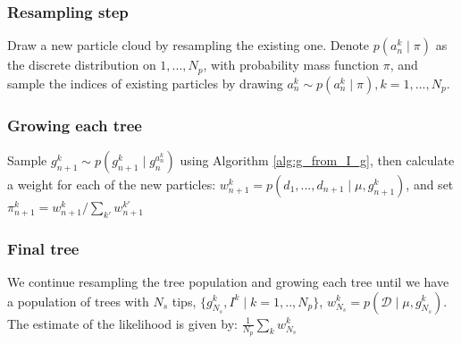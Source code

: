 \documentclass[a4paper,18pt]{report}
\begin{document}
\subsubsection{Resampling step}
Draw a new particle cloud by resampling the existing one. Denote $p(a_n^k \mid \pi)$ as the discrete distribution on $1,...,N_p$, with probability mass function $\pi$, and sample the indices of existing particles by drawing $a_n^k \sim p(a_n^k \mid \pi), k=1,...,N_p$.  

\subsubsection{Growing each tree}
Sample $g_{n+1}^k \sim p(g_{n+1}^k \mid g_n^{a_n^k})$ using Algorithm \ref{alg:g_from_I_g}, then calculate a weight for each of the new particles: $w_{n+1}^k=p(d_1,...,d_{n+1} \mid \mu, g_{n+1}^k)$, and set $\pi_{n+1}^k = w_{n+1}^{k} / \sum_{k'} w_{n+1}^{k'}$

\subsubsection{Final tree}
We continue resampling the tree population and growing each tree until we have a population of trees with $N_s$ tips, $\{g_{N_s}^k,  I^k \mid k=1,..,N_p\}$, $w_{N_s}^k = p(\mathcal{D} \mid \mu, g_{N_s}^k)$. The estimate of the likelihood is given by:
$\frac{1}{N_p} \sum_k w_{N_s}^k$
\end{document}
